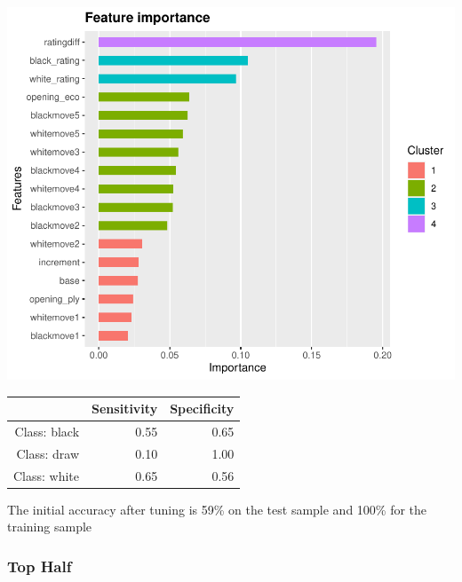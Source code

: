 \documentclass[12pt,preprint, authoryear]{elsarticle}
\let\origfigure\figure
\let\endorigfigure\endfigure
\renewenvironment{figure}[1][2] {
    \expandafter\origfigure\expandafter[H]
} {
    \endorigfigure
}
\let\origtable\table
\let\endorigtable\endtable
\renewenvironment{table}[1][2] {
    \expandafter\origtable\expandafter[H]
} {
    \endorigtable
}
\numberwithin{equation}{section}
\numberwithin{figure}{section}
\numberwithin{table}{section}
\begin{document}
\begin{figure}[H]

{\centering \includegraphics{WriteUp_files/figure-latex/importancelow2-1} 

}

\caption{Feature Importance Tuned Model: Bottom Half\label{Figure12}}\label{fig:importancelow2}
\end{figure}

\begin{table}[ht]
\centering
\begin{tabular}{rrr}
  \hline
 & Sensitivity & Specificity \\ 
  \hline
Class: black & 0.55 & 0.65 \\ 
  Class: draw & 0.10 & 1.00 \\ 
  Class: white & 0.65 & 0.56 \\ 
   \hline
\end{tabular}
\caption{Accuracy Bottom Sample: Tuned Model} 
\end{table}

The initial accuracy after tuning is 59\% on the test sample and 100\%
for the training sample

\hypertarget{top-half}{%
\subsubsection{Top Half}\label{top-half}}
\end{document}
